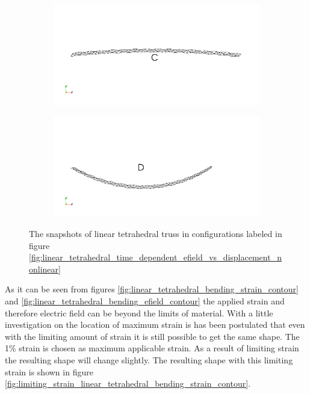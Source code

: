 \begin{figure}
\begin{subfigure}{.5\textwidth} 
  \centering
  \includegraphics[width=.8\linewidth]{./chap_5_active_trusses/images_non_linear_time_dependent_constitutive_equatio/linear_tetrahedral_bending_snapshop_C.png}
  \label{fig:sfigC}
\end{subfigure}%
\begin{subfigure}{.5\textwidth}
  \centering
  \includegraphics[width=.8\linewidth]{./chap_5_active_trusses/images_non_linear_time_dependent_constitutive_equatio/linear_tetrahedral_bending_snapshop_D.png}
  \label{fig:sfigD}
\end{subfigure}
\caption{The snapshots of linear tetrahedral truss in configurations labeled in figure \ref{fig:linear_tetrahedral_time_dependent_efield_vs_displacement_nonlinear}}
\label{fig:linear_tetrahedral_time_dependent_efield_vs_displacement_nonlinear_snapshot}
\end{figure}


As it can be seen from figures \ref{fig:linear_tetrahedral_bending_strain_contour} and \ref{fig:linear_tetrahedral_bending_efield_contour} the applied strain and therefore electric field can be beyond the limits of material.
With a little investigation on the location of maximum strain is has been postulated that even with the limiting amount of strain it is still possible to get the same shape.
The 1\% strain is chosen as maximum applicable strain.
As a result of limiting strain the resulting shape will change slightly.
The resulting shape with this limiting strain is shown in figure \ref{fig:limiting_strain_linear_tetrahedral_bending_strain_contour}.

